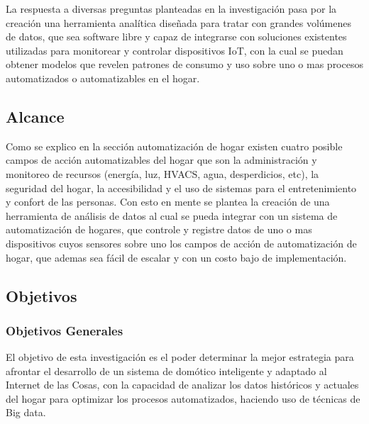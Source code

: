 La respuesta a diversas preguntas planteadas en la investigación pasa por la creación una herramienta analítica diseñada para tratar con grandes volúmenes de datos, que sea software libre y capaz de integrarse con soluciones existentes utilizadas para monitorear y controlar dispositivos IoT, con la cual se puedan obtener modelos que revelen patrones de consumo y uso sobre uno o mas procesos automatizados o automatizables en el hogar.

\subsection{Alcance}
Como se explico en la sección automatización de hogar existen cuatro posible campos de acción automatizables del hogar que son la administración y monitoreo de recursos (energía, luz, HVACS, agua, desperdicios, etc), la seguridad del hogar, la accesibilidad y el uso de sistemas para el entretenimiento y confort de las personas. Con esto en mente se plantea la creación de una herramienta de análisis de datos al cual se pueda integrar con  un sistema de automatización de hogares, que controle y registre datos de uno o mas dispositivos cuyos sensores sobre uno los campos de acción de automatización de hogar, que ademas sea fácil de escalar y con un costo bajo de implementación. 

\subsection{Objetivos}
\subsubsection{Objetivos Generales}
El objetivo de esta investigación es el poder determinar la mejor estrategia para afrontar el desarrollo de un sistema de domótico inteligente y adaptado al Internet de las Cosas, con la capacidad de analizar los datos históricos y actuales del hogar para optimizar los procesos automatizados, haciendo uso de técnicas de Big data.
